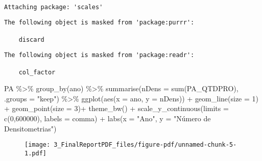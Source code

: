 \documentclass[
  letterpaper,
  DIV=11,
  numbers=noendperiod]{scrartcl}
\newenvironment{Shaded}{\begin{snugshade}}{\end{snugshade}}
\newcommand{\AttributeTok}[1]{\textcolor[rgb]{0.40,0.45,0.13}{#1}}
\newcommand{\DecValTok}[1]{\textcolor[rgb]{0.68,0.00,0.00}{#1}}
\newcommand{\FunctionTok}[1]{\textcolor[rgb]{0.28,0.35,0.67}{#1}}
\newcommand{\NormalTok}[1]{\textcolor[rgb]{0.00,0.23,0.31}{#1}}
\newcommand{\SpecialCharTok}[1]{\textcolor[rgb]{0.37,0.37,0.37}{#1}}
\newcommand{\StringTok}[1]{\textcolor[rgb]{0.13,0.47,0.30}{#1}}
\begin{document}
\begin{verbatim}

Attaching package: 'scales'
\end{verbatim}

\begin{verbatim}
The following object is masked from 'package:purrr':

    discard
\end{verbatim}

\begin{verbatim}
The following object is masked from 'package:readr':

    col_factor
\end{verbatim}

\begin{Shaded}
\begin{Highlighting}[]
\NormalTok{PA }\SpecialCharTok{\%\textgreater{}\%} 
  \FunctionTok{group\_by}\NormalTok{(ano) }\SpecialCharTok{\%\textgreater{}\%} 
  \FunctionTok{summarise}\NormalTok{(}\AttributeTok{nDens =} \FunctionTok{sum}\NormalTok{(PA\_QTDPRO), }\AttributeTok{.groups =} \StringTok{"keep"}\NormalTok{) }\SpecialCharTok{\%\textgreater{}\%} 
  \FunctionTok{ggplot}\NormalTok{(}\FunctionTok{aes}\NormalTok{(}\AttributeTok{x =}\NormalTok{ ano, }\AttributeTok{y =}\NormalTok{ nDens)) }\SpecialCharTok{+}
        \FunctionTok{geom\_line}\NormalTok{(}\AttributeTok{size =} \DecValTok{1}\NormalTok{) }\SpecialCharTok{+}
        \FunctionTok{geom\_point}\NormalTok{(}\AttributeTok{size =} \DecValTok{3}\NormalTok{)}\SpecialCharTok{+}
        \FunctionTok{theme\_bw}\NormalTok{() }\SpecialCharTok{+} 
        \FunctionTok{scale\_y\_continuous}\NormalTok{(}\AttributeTok{limits =} \FunctionTok{c}\NormalTok{(}\DecValTok{0}\NormalTok{,}\DecValTok{600000}\NormalTok{), }\AttributeTok{labels =}\NormalTok{ comma) }\SpecialCharTok{+}
        \FunctionTok{labs}\NormalTok{(}\AttributeTok{x =} \StringTok{"Ano"}\NormalTok{, }\AttributeTok{y =} \StringTok{"Número de Densitometrias"}\NormalTok{)}
\end{Highlighting}
\end{Shaded}

\begin{figure}[H]

{\centering \texttt{[image: 3\_FinalReportPDF\_files/figure-pdf/unnamed-chunk-5-1.pdf]}

}

\end{figure}
\end{document}
